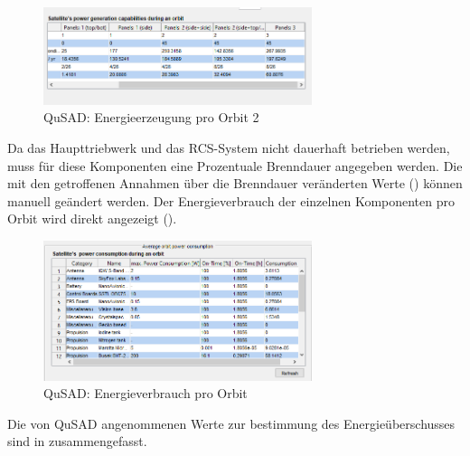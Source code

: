 			\begin{figure}[!h]
				\centering
					\includegraphics[width=0.70\textwidth]{graphics/power4.PNG}
				\caption{QuSAD: Energieerzeugung pro Orbit 2}
				\label{fig:power4}
			\end{figure}
Da das Haupttriebwerk und das RCS-System nicht dauerhaft betrieben werden, muss für diese Komponenten eine Prozentuale Brenndauer angegeben werden. Die mit den getroffenen Annahmen über die Brenndauer veränderten Werte  () können manuell geändert werden. Der Energieverbrauch der einzelnen Komponenten pro Orbit wird direkt angezeigt ().
			
			\begin{figure}[!h]
				\centering
					\includegraphics[width=0.70\textwidth]{graphics/power5.png}
				\caption{QuSAD: Energieverbrauch pro Orbit}
				\label{fig:power5}
			\end{figure}
Die von QuSAD angenommenen Werte zur bestimmung des Energieüberschusses sind in   zusammengefasst.
			
